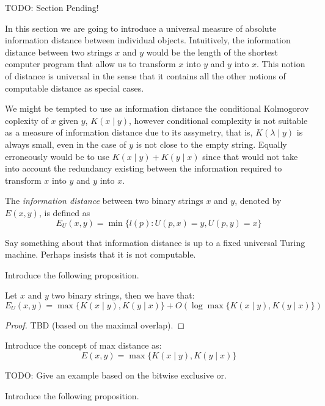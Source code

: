 {\color{red} TODO: Section Pending!}

In this section we are going to introduce a universal measure of absolute information distance between individual objects. Intuitively, the information distance between two strings $x$ and $y$ would be the length of the shortest computer program that allow us to transform $x$ into $y$ and $y$ into $x$. This notion of distance is universal in the sense that it contains all the other notions of computable distance as special cases.

We might be tempted to use as information distance the conditional Kolmogorov coplexity of $x$ given $y$, $K(x \mid y)$, however conditional complexity is not suitable as a measure of information distance due to its assymetry, that is, $K( \lambda \mid y)$ is always small, even in the case of $y$ is not close to the empty string. Equally erroneously would be to use $K(x \mid y) + K(y \mid x)$ since that would not take into account the redundancy existing between the information required to transform $x$ into $y$ and $y$ into $x$.

\begin{definition}
The \emph{information distance} between two binary strings $x$ and $y$, denoted by $E(x, y)$, is defined as
\[
E_U(x, y) = \min \{ l(p) : U(p, x) = y, U(p, y) = x \}
\]
\end{definition}

{\color{red} Say something about that information distance is up to a fixed universal Turing machine. Perhaps insists that it is not computable.}

{\color{red} Introduce the following proposition.}

\begin{proposition}
Let $x$ and $y$ two binary strings, then we have that:
\[
E_U(x, y) = \max\{ K(x \mid y), K(y \mid x) \} + O ( \log \max\{ K(x \mid y), K(y \mid x) \}) 
\]
\end{proposition}
\begin{proof}
{\color{red} TBD (based on the maximal overlap).}
\end{proof}

{\color{red} Introduce the concept of max distance as:}
\[
E(x, y) = \max\{ K(x \mid y), K(y \mid x) \}
\]

\begin{example}
{\color{red} TODO: Give an example based on the bitwise exclusive or.}
\end{example}

{\color{red} Introduce the following proposition.}

